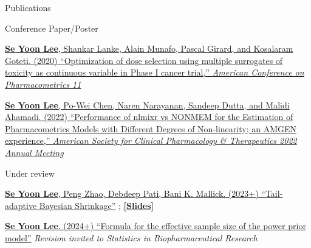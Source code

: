 \documentclass[
	11pt, %
]{resume} %
\begin{document}
\begin{rSection}{Publications}
\begin{rSubsection}{Conference Paper/Poster}{}{}{}
\item[] [1] 
\href{https://github.com/yain22/2PLD/blob/main/Poster/ACOP_Se_Yoon_Lee_PhD.pdf}{\underline{\textbf{Se Yoon Lee}}, Shankar Lanke, Alain Munafo, Pascal Girard, and Kosalaram Goteti. (2020)
``Optimization of dose selection using multiple surrogates of toxicity as continuous variable in Phase I cancer trial,'' \textit{American Conference on Pharmacometrics 11}}
\item[] [2] 
\href{https://github.com/yain22/2PLD/blob/main/Poster/ASCPT-2022-Poster_nlmixr_Final.pdf}{\underline{\textbf{Se Yoon Lee}}, Po-Wei Chen, Naren Narayanan, Sandeep Dutta, and Malidi Ahamadi. (2022)
``Performance of nlmixr vs NONMEM for the Estimation of Pharmacometrics Models with Different Degrees of Non-linearity; an AMGEN experience,'' \textit{American Society for Clinical Pharmacology \& Therapeutics 2022 Annual Meeting}}
\end{rSubsection}



\begin{rSubsection}{Under review}{}{}{}
\item[] [1]
\href{https://arxiv.org/abs/2007.02192}
{\underline{\textbf{Se Yoon Lee}}, Peng Zhao, Debdeep Pati, Bani K. Mallick. (2023+)
``Tail-adaptive Bayesian Shrinkage''}
;
\href{https://www.dropbox.com/s/5sx21h4guwl4dyz/Main_Doctoral_Dissertation_Work.pdf?dl=0}{\underline{\textbf{[Slides]}}}
\item[] [2]
\href{}
{\underline{\textbf{Se Yoon Lee}}. (2024+)
	``Formula for the effective sample size of the power prior model''} \textit{Revision invited to Statistics in Biopharmaceutical Research}
\end{rSubsection}
\end{rSection}
\end{document}
